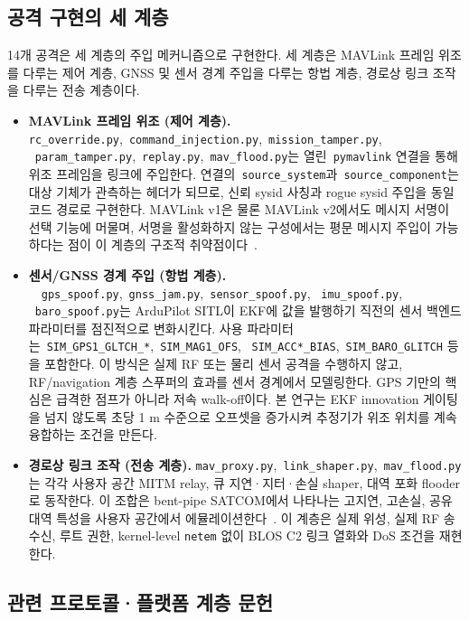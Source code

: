 \subsection{공격 구현의 세 계층}
14개 공격은 세 계층의 주입 메커니즘으로 구현한다. 
%
세 계층은 MAVLink 프레임 위조를 다루는 제어 계층, GNSS 및 센서 경계 주입을 다루는 항법 계층, 경로상 링크 조작을 다루는 전송 계층이다.
%
\begin{itemize}[leftmargin=*]
    \item \textbf{MAVLink 프레임 위조 (제어 계층).}
    \texttt{rc\_override.py},~\texttt{command\_injection.py},~\texttt{mission\_tamper.py}, ~\texttt{param\_tamper.py},~\texttt{replay.py},~\texttt{mav\_flood.py}는 열린~\texttt{pymavlink} 연결을 통해 위조 프레임을 링크에 주입한다. 연결의~\texttt{source\_system}과~\texttt{source\_component}는 대상 기체가 관측하는 헤더가 되므로, 신뢰 sysid 사칭과 rogue sysid 주입을 동일 코드 경로로 구현한다. MAVLink v1은 물론 MAVLink v2에서도 메시지 서명이 선택 기능에 머물며, 서명을 활성화하지 않는 구성에서는 평문 메시지 주입이 가능하다는 점이 이 계층의 구조적 취약점이다~\cite{uas_survey_sok,mavlink_nutshell,cve202010283}.
    \item \textbf{센서/GNSS 경계 주입 (항법 계층).}
    ~~\texttt{gps\_spoof.py},~\texttt{gnss\_jam.py},~\texttt{sensor\_spoof.py}, ~\texttt{imu\_spoof.py},   
    ~\texttt{baro\_spoof.py}는 ArduPilot SITL이 EKF에 값을 발행하기 직전의 센서 백엔드 파라미터를 점진적으로 변화시킨다. 사용 파라미터는~\texttt{SIM\_GPS1\_GLTCH\_*},~\texttt{SIM\_MAG1\_OFS}, ~\texttt{SIM\_ACC*\_BIAS},~\texttt{SIM\_BARO\_GLITCH} 등을 포함한다. 이 방식은 실제 RF 또는 물리 센서 공격을 수행하지 않고, RF/navigation 계층 스푸퍼의 효과를 센서 경계에서 모델링한다. GPS 기만의 핵심은 급격한 점프가 아니라 저속 walk-off이다. 본 연구는 EKF innovation 게이팅을 넘지 않도록 초당 1 m 수준으로 오프셋을 증가시켜 추정기가 위조 위치를 계속 융합하는 조건을 만든다.
    \item \textbf{경로상 링크 조작 (전송 계층).}
    \texttt{mav\_proxy.py},~\texttt{link\_shaper.py},~\texttt{mav\_flood.py}는 각각 사용자 공간 MITM relay, 큐 지연·지터·손실 shaper, 대역 포화 flooder로 동작한다. 이 조합은 bent-pipe SATCOM에서 나타나는 고지연, 고손실, 공유 대역 특성을 사용자 공간에서 에뮬레이션한다~\cite{theaterq}. 이 계층은 실제 위성, 실제 RF 송수신, 루트 권한, kernel-level \texttt{netem} 없이 BLOS C2 링크 열화와 DoS 조건을 재현한다.
\end{itemize}

\subsection{관련 프로토콜·플랫폼 계층 문헌}

